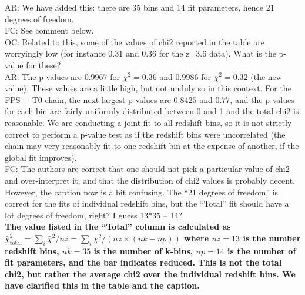 \documentclass[12pt]{article}
\begin{document}
AR: We have added this: there are 35 bins and 14 fit parameters, hence 21 degrees of freedom.\\

FC: See comment below.\\


OC: Related to this, some of the values of chi2 reported in the table are worryingly low (for instance 0.31 and 0.36 for the z=3.6 data). What is the p-value for these?\\

AR: The p-values are $0.9967$ for $\chi^2 = 0.36$ and $0.9986$ for $\chi^2 = 0.32$ (the new value). These values are a little high, but not unduly so in this context. For the FPS + T0 chain, the next largest p-values are $0.8425$ and $0.77$, and the p-values for each bin are fairly uniformly distributed between 0 and 1 and the total chi2 is reasonable. We are conducting a joint fit to all redshift bins, so it is not strictly correct to perform a p-value test as if the redshift bins were uncorrelated (the chain may very reasonably fit to one redshift bin at the expense of another, if the global fit improves).\\

FC: The authors are correct that one should not pick a particular value of chi2 and over-interpret it, and that the distribution of chi2 values is probably decent. However, the caption now is a bit confusing. The “21 degrees of freedom” is correct for the fits of individual redshift bins, but the “Total” fit should have a lot degrees of freedom, right? I guess 13*35 – 14?\\

\textbf{The value listed in the ``Total'' column is calculated as $\bar{\chi}^2_{\text{total}} = \sum_i \bar{\chi}^2 / nz = \sum_i \chi^2 /(nz \times (nk - np))$ where $nz = 13$ is the number redshift bins, $nk=35$ is the number of k-bins, $np=14$ is the number of fit parameters, and the bar indicates reduced. This is not the total chi2, but rather the average chi2 over the individual redshift bins. We have clarified this in the table and the caption.}\\

\hrulefill \newline
\end{document}
